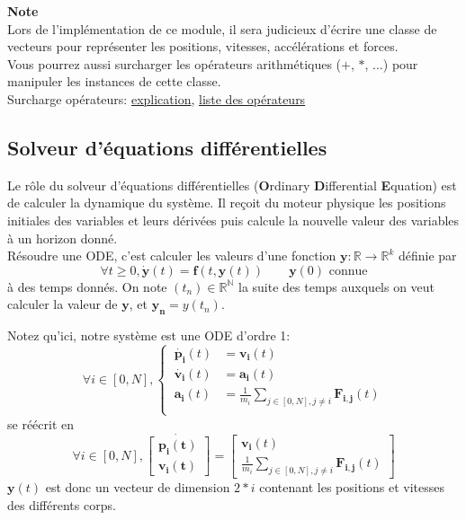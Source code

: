 \documentclass{article}
\newcommand{\myvec}[1]{\ensuremath{\mathbf{#1}}}
\begin{document}
\noindent\textbf{Note} \\
Lors de l'implémentation de ce module, il sera judicieux d'écrire une classe de vecteurs pour représenter les positions, vitesses, accélérations et forces. \\
Vous pourrez aussi surcharger les opérateurs arithmétiques ($+$, $*$, ...) pour manipuler les instances de cette classe.\\
Surcharge opérateurs: \href{https://openclassrooms.com/fr/courses/235344-apprenez-a-programmer-en-python/233046-appliquez-des-methodes-speciales#/id/r-232928}{explication}, \href{https://docs.python.org/fr/3/library/operator.html}{liste des opérateurs}

\subsection{Solveur d'équations différentielles}
\label{solveur}

Le rôle du solveur d'équations différentielles (\textbf{O}rdinary \textbf{D}ifferential \textbf{E}quation) est de calculer la dynamique du système. Il reçoit du moteur physique les positions initiales des variables et leurs dérivées puis calcule la nouvelle valeur des variables à un horizon donné.\\
Résoudre une ODE, c'est calculer les valeurs d'une fonction $\myvec{y} : \mathbb{R} \rightarrow \mathbb{R}^k$ définie par
\begin{equation*}
\forall t \ge 0, \myvec{\dot{y}}(t) = \myvec{f}(t, \myvec{y}(t)) \quad\quad \myvec{y}(0) \text{ connue}
\end{equation*}
à des temps donnés. On note $(t_n) \in \mathbb{R}^\mathbb{N}$ la suite des temps auxquels on veut calculer la valeur de $\myvec{y}$, et $\myvec{y_n} = y(t_n)$.

\vspace{1em}

\noindent Notez qu'ici, notre système est une ODE d'ordre 1:
\begin{equation*}
    \forall i \in [0,N], \left\{\begin{aligned}
        \ \myvec{\dot{p_i}}(t) & = \myvec{v_i}(t) \\
        \ \myvec{\dot{v_i}}(t) & = \myvec{a_i}(t) \\
        \ \myvec{a_i}(t) & = \frac{1}{m_i} \sum_{j \in [0,N], j \ne i} \myvec{F_{i,j}}(t) \\
    \end{aligned}\right.
\end{equation*}
se réécrit en
\begin{equation*}
    \forall i \in [0,N], \myvec{\dot{\left[\begin{aligned}
        \myvec{p_i}(t) \\ \myvec{v_i}(t)
    \end{aligned}\right]}} =
    \left[\begin{gathered}
    \myvec{v_i}(t) \\ \frac{1}{m_i} \sum_{j \in [0,N], j \ne i} \myvec{F_{i,j}}(t)
    \end{gathered}\right]
\end{equation*}
$\myvec{y}(t)$ est donc un vecteur de dimension $2 * i$ contenant les positions et vitesses des différents corps.
\end{document}
